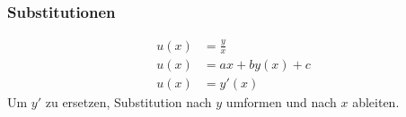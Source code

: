 \subsubsection{Substitutionen}
    \begin{align*}
        u(x) &= \frac{y}{x}\\
        u(x) &= ax + by(x) + c\\
        u(x) &= y'(x)    
    \end{align*}
    Um $y'$ zu ersetzen, Substitution nach $y$ umformen und nach $x$ ableiten.